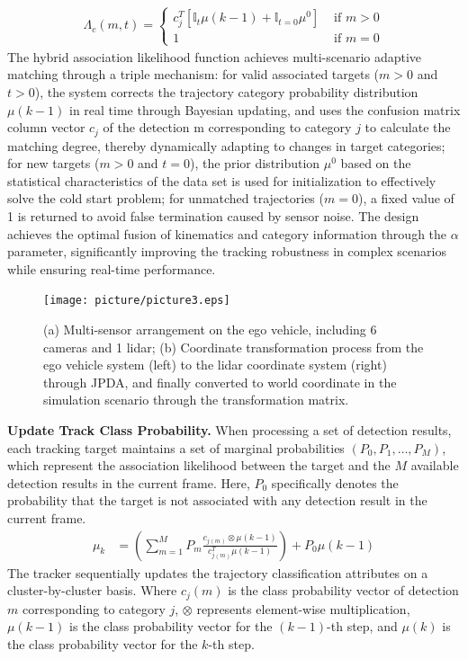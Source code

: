 \documentclass[journal,twoside,web]{ieeecolor}
\begin{document}
\begin{align}
	\Lambda_{c}(m, t) = \left\{\begin{array}{ll}
		c_{j}^{T}\left[\mathbb{I}_t \mu(k-1)+\mathbb{I}_{t = 0} \mu^{0}\right] & \text { if } m>0 \\
		1 & \text { if } m = 0
	\end{array}\right.
\end{align}
The hybrid association likelihood function achieves multi-scenario adaptive matching through a triple mechanism: for valid associated targets (\(m>0\) and \(t>0\)), the system corrects the trajectory category probability distribution \(\mu(k-1)\) in real time through Bayesian updating, and uses the confusion matrix column vector \(c_j\) of the detection m corresponding to category \(j\) to calculate the matching degree, thereby dynamically adapting to changes in target categories; for new targets (\(m>0\) and \(t=0\)), the prior distribution \(\mu^{0}\) based on the statistical characteristics of the data set is used for initialization to effectively solve the cold start problem; for unmatched trajectories (\(m=0\)), a fixed value of 1 is returned to avoid false termination caused by sensor noise. The design achieves the optimal fusion of kinematics and category information through the \(\alpha\) parameter, significantly improving the tracking robustness in complex scenarios while ensuring real-time performance.

\begin{figure}[!t]
	\centerline{\texttt{[image: picture/picture3.eps]}}
	\caption{(a) Multi-sensor arrangement on the ego vehicle, including 6 cameras and 1 lidar; (b) Coordinate transformation process from the ego vehicle system (left) to the lidar coordinate system (right) through JPDA, and finally converted to world coordinate in the simulation scenario through the transformation matrix.} 
	\label{fig:3} 
\end{figure}

\textbf{Update Track Class Probability.}
When processing a set of detection results, each tracking target maintains a set of marginal probabilities \(\left(P_{0}, P_{1}, \ldots, P_{M}\right)\), which represent the association likelihood between the target and the \(M\) available detection results in the current frame. Here, \(P_{0}\) specifically denotes the probability that the target is not associated with any detection result in the current frame.
\begin{align}
	\mu_{k} & = \left(\sum_{m = 1}^{M} P_{m} \frac{c_{j(m)} \otimes \mu(k-1)}{c_{j(m)}^{T} \mu(k-1)}\right)+ P_{0} \mu(k-1)
\end{align}
The tracker sequentially updates the trajectory classification attributes on a cluster-by-cluster basis. 
Where \(c_{j}(m)\) is the class probability vector of detection \(m\) corresponding to category \(j\), \(\otimes\) represents element-wise multiplication, \(\mu(k-1)\) is the class probability vector for the \((k-1)\)-th step, and \(\mu(k)\) is the class probability vector for the \(k\)-th step.
\end{document}

